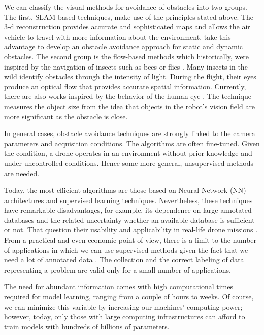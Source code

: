 We can classify the visual methods for avoidance of obstacles into two groups. The first, SLAM-based techniques, make use of the principles stated above. The 3-d reconstruction provides accurate and sophisticated maps and allows the air vehicle to travel with more information about the environment. \cite{Moreno-Armendariz.Calvo:ICMEAE:2014} take this advantage to develop an obstacle avoidance approach for static and dynamic obstacles. The second group is the flow-based methods which historically, were inspired by the navigation of insects such as bees \citep{Srinivasan.Gregory:PTBS:1992} or flies \citep{Franceschini.Ruffier.ea:InTech:2009}. Many insects in the wild identify obstacles through the intensity of light. During the flight, their eyes produce an optical flow that provides accurate spatial information. Currently, there are also works inspired by the behavior of the human eye \citep{Al-Kaff.Meng.ea:IVS:2016}. The technique measures the object size from the idea that objects in the robot's vision field are more significant as the obstacle is close.

In general cases, obstacle avoidance techniques are strongly linked to the camera parameters and acquisition conditions. The algorithms are often fine-tuned. Given the condition, a drone operates in an environment without prior knowledge and under uncontrolled conditions. Hence some more general, unsupervised methods are needed.

Today, the most efficient algorithms are those based on Neural Network (NN) architectures and supervised learning techniques. Nevertheless, these techniques have remarkable disadvantages, for example,  its dependence on large annotated databases and the related uncertainty whether an available database is sufficient or not. That question their usability and applicability in real-life drone missions \citep{Treboux.Genoud.ea:IWBIS:2018}. From a practical and even economic point of view, there is a limit to the number of applications in which we can use supervised methods given the fact that we need a lot of annotated data \citep{Xu.Wang.ea:CEA:2020}. The collection and the correct labeling of data representing a problem are valid only for a small number of applications.

The need for abundant information comes with high computational times required for model learning, ranging from a couple of hours to weeks. Of course, we can minimize this variable by increasing our machines' computing power; however, today, only those with large computing infrastructures can afford to train models with hundreds of billions of parameters.  

